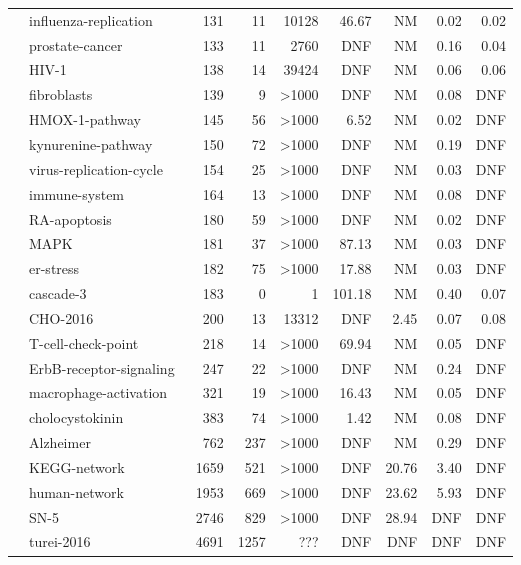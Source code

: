 \documentclass[runningheads]{llncs}
\newcounter{rownumber}
\newcommand\rownb{\stepcounter{rownumber}\arabic{rownumber}}
\begin{document}
\begin{table}[!htb]
\begin{tabular}{rlrrrrrrr}
    \rownb & influenza-replication~\cite{DBLP:journals/bmcsb/HelikarKMBRMWSLR12} & 131 & 11 & 10128 & 46.67 & NM & 0.02 & 0.02\\
    \rownb & prostate-cancer~\cite{Montagud2021} & 133 & 11 & 2760 & DNF & NM & 0.16 & 0.04\\
    \rownb & HIV-1~\cite{DBLP:journals/bmcsb/HelikarKMBRMWSLR12} & 138 & 14 & 39424 & DNF & NM & 0.06 & 0.06\\
    \rownb & fibroblasts~\cite{helikar2008emergent} & 139 & 9 & >1000 & DNF & NM & 0.08 & DNF\\
    \rownb & HMOX-1-pathway~\cite{ostaszewski2021covid19} & 145 & 56 & >1000 & 6.52 & NM & 0.02 & DNF\\
    \rownb & kynurenine-pathway~\cite{ostaszewski2021covid19} & 150 & 72 & >1000 & DNF & NM & 0.19 & DNF\\
    \rownb & virus-replication-cycle~\cite{ostaszewski2021covid19} & 154 & 25 & >1000 & DNF & NM & 0.03 & DNF\\
    \rownb & immune-system~\cite{DBLP:journals/bmcsb/HelikarKMBRMWSLR12} & 164 & 13 & >1000 & DNF & NM & 0.08 & DNF\\
    \rownb & RA-apoptosis~\cite{aghamiri2020automated} & 180 & 59 & >1000 & DNF & NM & 0.02 & DNF\\
    \rownb & MAPK~\cite{aghamiri2020automated} & 181 & 37 & >1000 & 87.13 & NM & 0.03 & DNF\\
    \rownb & er-stress~\cite{ostaszewski2021covid19} & 182 & 75 & >1000 & 17.88 & NM & 0.03 & DNF\\
    \rownb & cascade-3~\cite{Tsirvouli2020} & 183 & 0 & 1 & 101.18 & NM & 0.40 & 0.07\\
    \rownb & CHO-2016~\cite{lee2019signal} & 200 & 13 & 13312 & DNF & 2.45 & 0.07 & 0.08\\
    \rownb & T-cell-check-point~\cite{hernandez2020computational} & 218 & 14 & >1000 & 69.94 & NM & 0.05 & DNF\\
    \rownb & ErbB-receptor-signaling~\cite{helikar2013comprehensive} & 247 & 22 & >1000 & DNF & NM & 0.24 & DNF\\
    \rownb & macrophage-activation~\cite{DBLP:journals/bmcsb/HelikarKMBRMWSLR12} & 321 & 19 & >1000 & 16.43 & NM & 0.05 & DNF\\
    \rownb & cholocystokinin~\cite{aghamiri2020automated} & 383 & 74 & >1000 & 1.42 & NM & 0.08 & DNF\\
    \rownb & Alzheimer~\cite{aghamiri2020automated} & 762 & 237 & >1000 & DNF & NM & 0.29 & DNF\\ \midrule
    \rownb & KEGG-network~\cite{DBLP:journals/bmcsb/Kwon16} & 1659 & 521 & >1000 & DNF & 20.76 & 3.40 & DNF\\
    \rownb & human-network~\cite{kim2011reduction} & 1953 & 669 & >1000 & DNF & 23.62 & 5.93 & DNF\\
    \rownb & SN-5~\cite{kim2013rmod} & 2746 & 829 & >1000 & DNF & 28.94 & DNF & DNF\\
    \rownb & turei-2016~\cite{lee2019signal} & 4691 & 1257 & ??? & DNF & DNF & DNF & DNF\\
    \bottomrule
  \end{tabular}
\end{table}
\end{document}
